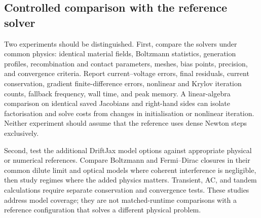 \documentclass[11pt,a4paper]{article}
\numberwithin{equation}{section}
\begin{document}
\subsection{Controlled comparison with the reference solver}
Two experiments should be distinguished. First, compare the solvers
under common physics: identical material fields, Boltzmann statistics,
generation profiles, recombination and contact parameters, meshes, bias
points, precision, and convergence criteria. Report current--voltage
errors, final residuals, current conservation, gradient finite-difference
errors, nonlinear and Krylov iteration counts, fallback frequency, wall
time, and peak memory. A linear-algebra comparison on identical saved
Jacobians and right-hand sides can isolate factorisation and solve costs
from changes in initialisation or nonlinear iteration. Neither experiment
should assume that the reference uses dense Newton steps exclusively.

Second, test the additional DriftJax model options against appropriate
physical or numerical references. Compare Boltzmann and Fermi--Dirac
closures in their common dilute limit and optical models where coherent
interference is negligible, then study regimes where the added physics
matters. Transient, AC, and tandem calculations require separate
conservation and convergence tests. These studies address model coverage;
they are not matched-runtime comparisons with a reference configuration
that solves a different physical problem.
\end{document}
